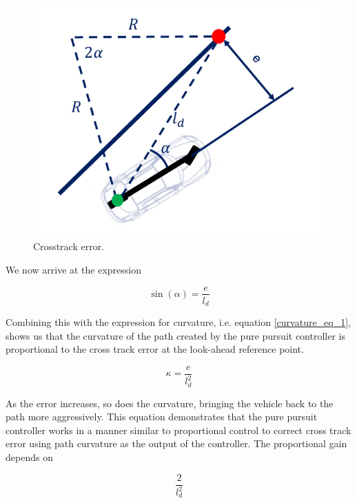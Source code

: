 \begin{figure}[!htb]
\begin{center}
\includegraphics[scale=0.280]{img/lateral_control/pure_pursuit_form_2.jpeg}
\end{center}
\caption{Crosstrack error.}
\label{pure_pursuit_form_2}
\end{figure}

We now arrive at the expression

\begin{equation}
\sin(\alpha) = \frac{e}{l_d}
\end{equation}

Combining this with the expression for curvature, i.e. equation \ref{curvature_eq_1}, shows us that the curvature of the path created by the pure pursuit controller is proportional to the cross track error at the look-ahead reference point.

\begin{equation}
\kappa = \frac{e}{l_{d}^2}
\label{curvature_eq_2}
\end{equation}

As the error increases, so does the curvature, bringing the vehicle back to the path more aggressively. This equation demonstrates that the pure pursuit controller works in a manner similar to proportional control to correct cross track error using path curvature as the output of the controller. The proportional gain depends on 

\begin{equation}
\frac{2}{l_{d}^2}
\end{equation}

